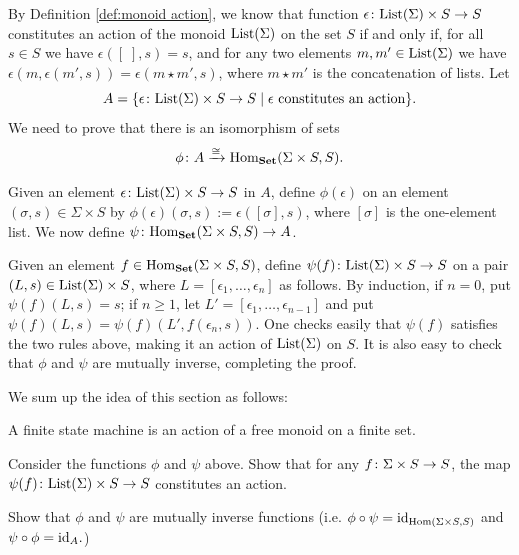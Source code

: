 \begin{proofENG}
By Definition \ref{def:monoid action}, we know that function $\epsilon\colon\textnormal{List}(\Sigma)\times S\rightarrow S$ constitutes an action of the monoid $\textnormal{List}(\Sigma)$ on the set $S$ if and only if, for all $s\in S$ we have $\epsilon([\;],s)=s$, and for any two elements $m,m'\in\textnormal{List}(\Sigma)$ we have $\epsilon(m,\epsilon(m',s))=\epsilon(m\star m',s)$, where $m\star m'$ is the concatenation of lists. Let $$A=\{\epsilon\colon \textnormal{List}(\Sigma)\times S\rightarrow S{\;|\;}\epsilon\textnormal{ constitutes an action}\}.$$ We need to prove that there is an isomorphism of sets $$\phi\colon A\xrightarrow{\cong}\textnormal{Hom}_{\bf Set}(\Sigma\times S,S).$$

Given an element $\epsilon\colon\textnormal{List}(\Sigma)\times S\rightarrow S$ in $A$, define $\phi(\epsilon)$ on an element $(\sigma,s)\in\Sigma\times S$ by $\phi(\epsilon)(\sigma,s):=\epsilon([\sigma],s)$, where $[\sigma]$ is the one-element list. We now define $\psi\colon\textnormal{Hom}_{\bf Set}(\Sigma\times S,S)\rightarrow A$.

Given an element $f\in\textnormal{Hom}_{\bf Set}(\Sigma\times S,S)$, define $\psi(f)\colon\textnormal{List}(\Sigma)\times S\rightarrow S$ on a pair $(L,s)\in\textnormal{List}(\Sigma)\times S$, where $L=[\epsilon_1,\ldots,\epsilon_n]$ as follows. By induction, if $n=0$, put $\psi(f)(L,s)=s$; if $n\geq 1$, let $L'=[\epsilon_1,\ldots,\epsilon_{n-1}]$ and put $\psi(f)(L,s)=\psi(f)(L',f(\epsilon_n,s))$. One checks easily that $\psi(f)$ satisfies the two rules above, making it an action of $\textnormal{List}(\Sigma)$ on $S$. It is also easy to check that $\phi$ and $\psi$ are mutually inverse, completing the proof.
\end{proofENG}

\begin{proofRUS}
\end{proofRUS}

\begin{blockENG}
We sum up the idea of this section as follows:
\begin{slogan}
A finite state machine is an action of a free monoid on a finite set.
\end{slogan}
\end{blockENG}

\begin{blockRUS}
\end{blockRUS}

\begin{exerciseENG}
Consider the functions $\phi$ and $\psi$ above. 
\sexc Show that for any $f\colon\Sigma\times S\rightarrow S$, the map $\psi(f)\colon\textnormal{List}(\Sigma)\times S\rightarrow S$ constitutes an action. 
\item Show that $\phi$ and $\psi$ are mutually inverse functions (i.e. $\phi\circ\psi=\textnormal{id}_{\textnormal{Hom}(\Sigma\times S,S)}$ and $\psi\circ\phi=\textnormal{id}_{A}.$)
\endsexc
\end{exerciseENG}

